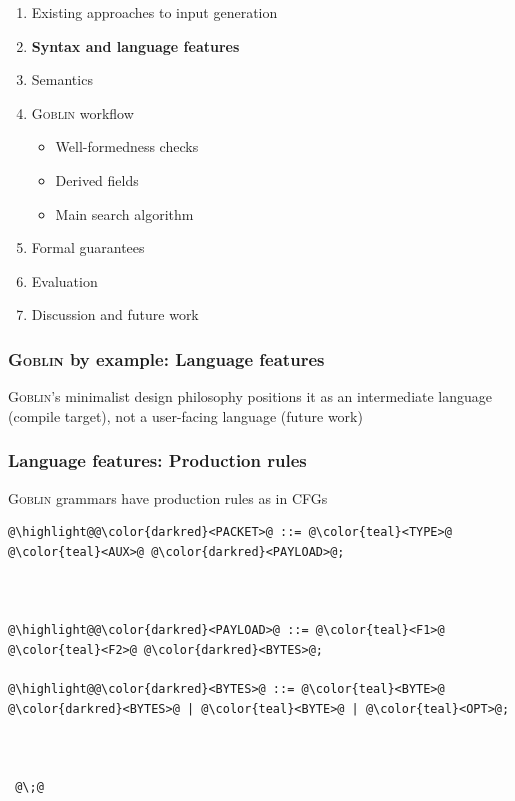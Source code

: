 \documentclass[11pt,xcolor={dvipsnames},hyperref={pdftex,pdfpagemode=UseNone,hidelinks,pdfdisplaydoctitle=true},usepdftitle=false]{beamer}
\newcommand{\system}{\textsc{Goblin}}
\newcommand{\green}[1]{\textcolor{green!60!black}{#1}}
\begin{document}
\begin{frame}
\begin{enumerate}
  \item Existing approaches to input generation
  \item \green{\textbf{Syntax and language features}}
  \item Semantics 
  \item \system{} workflow
  \begin{itemize}
    \item Well-formedness checks
    \item Derived fields
    \item Main search algorithm
  \end{itemize}
  \item Formal guarantees
  \item Evaluation
  \item Discussion and future work
\end{enumerate}
\end{frame}

\begin{frame}\frametitle{\system{} by example: Language features}
  \system{}'s \green{minimalist} design philosophy positions it as an \green{intermediate language} 
  (compile target), not a \green{user-facing language} (future work)
\end{frame}

\begin{frame}[fragile]
    \frametitle{Language features: Production rules}\pause
\system{} grammars have \green{production rules} as in CFGs\\[4pt]\pause
\begin{lstlisting}[style=goblin]
@\highlight@@\color{darkred}<PACKET>@ ::= @\color{teal}<TYPE>@ @\color{teal}<AUX>@ @\color{darkred}<PAYLOAD>@;



@\highlight@@\color{darkred}<PAYLOAD>@ ::= @\color{teal}<F1>@ @\color{teal}<F2>@ @\color{darkred}<BYTES>@; 

@\highlight@@\color{darkred}<BYTES>@ ::= @\color{teal}<BYTE>@ @\color{darkred}<BYTES>@ | @\color{teal}<BYTE>@ | @\color{teal}<OPT>@;



 @\;@
\end{lstlisting}
\end{frame}
\end{document}
